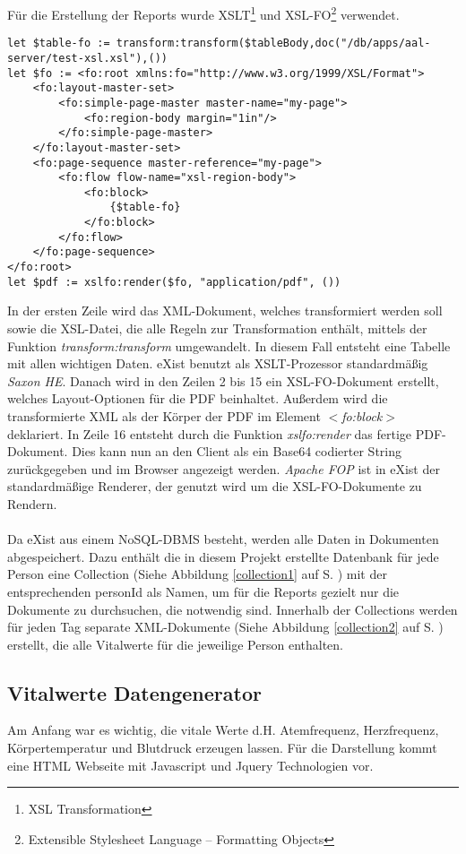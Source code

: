 Für die Erstellung der Reports wurde XSLT\footnote[1]{XSL Transformation} und XSL-FO\footnote[2]{Extensible Stylesheet Language – Formatting Objects} verwendet. 

\begin{lstlisting}
let $table-fo := transform:transform($tableBody,doc("/db/apps/aal-server/test-xsl.xsl"),())
let $fo := <fo:root xmlns:fo="http://www.w3.org/1999/XSL/Format">
    <fo:layout-master-set>
        <fo:simple-page-master master-name="my-page">
            <fo:region-body margin="1in"/>
        </fo:simple-page-master>
    </fo:layout-master-set>
    <fo:page-sequence master-reference="my-page">
        <fo:flow flow-name="xsl-region-body">
            <fo:block>
                {$table-fo}
            </fo:block>
        </fo:flow>
    </fo:page-sequence>
</fo:root>
let $pdf := xslfo:render($fo, "application/pdf", ())
\end{lstlisting}

In der ersten Zeile wird das XML-Dokument, welches transformiert werden soll sowie die XSL-Datei, die alle Regeln zur Transformation enthält, mittels der Funktion \textit{transform:transform} umgewandelt. In diesem Fall entsteht eine Tabelle mit allen wichtigen Daten. eXist benutzt als XSLT-Prozessor standardmäßig \textit{Saxon HE}. Danach wird in den Zeilen 2 bis 15 ein XSL-FO-Dokument erstellt, welches Layout-Optionen für die PDF beinhaltet. Außerdem wird die transformierte XML als der Körper der PDF im Element \textit{$<$fo:block$>$} deklariert. In Zeile 16 entsteht durch die Funktion \textit{xslfo:render} das fertige PDF-Dokument. Dies kann nun an den Client als ein Base64 codierter String zurückgegeben und im Browser angezeigt werden. \textit{Apache FOP} ist in eXist der standardmäßige Renderer, der genutzt wird um die XSL-FO-Dokumente zu Rendern. 
\\
\\
Da eXist aus einem NoSQL-DBMS besteht, werden alle Daten in Dokumenten abgespeichert. Dazu enthält die in diesem Projekt erstellte Datenbank für jede Person eine Collection (Siehe Abbildung \ref{collection1} auf S. \pageref{collection1}) mit der entsprechenden personId als Namen, um für die Reports gezielt nur die Dokumente zu durchsuchen, die notwendig sind. Innerhalb der Collections werden für jeden Tag separate XML-Dokumente (Siehe Abbildung \ref{collection2} auf S. \pageref{collection2}) erstellt, die alle Vitalwerte für die jeweilige Person enthalten.
\subsection{Vitalwerte Datengenerator}
Am Anfang war es wichtig, die vitale Werte d.H. Atemfrequenz, Herzfrequenz, Körpertemperatur und Blutdruck erzeugen lassen. Für die Darstellung kommt eine HTML Webseite mit Javascript und Jquery Technologien vor.

